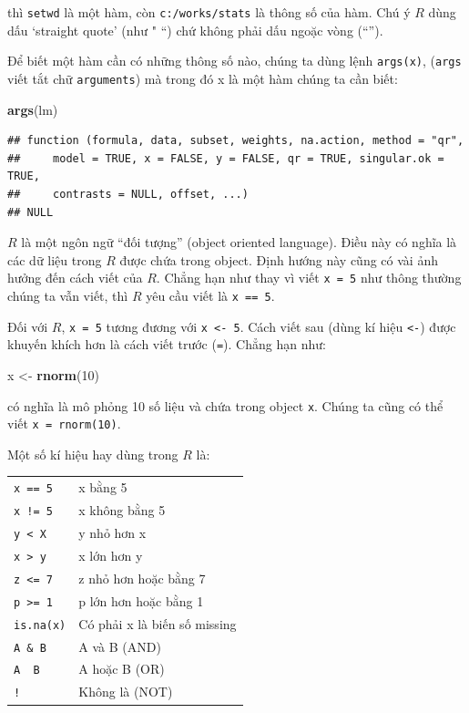 \documentclass[
]{book}
\newenvironment{Shaded}{\begin{snugshade}}{\end{snugshade}}
\newcommand{\DecValTok}[1]{\textcolor[rgb]{0.00,0.00,0.81}{#1}}
\newcommand{\KeywordTok}[1]{\textcolor[rgb]{0.13,0.29,0.53}{\textbf{#1}}}
\newcommand{\NormalTok}[1]{#1}
\newcommand{\StringTok}[1]{\textcolor[rgb]{0.31,0.60,0.02}{#1}}
\begin{document}
thì \texttt{setwd} là một hàm, còn \texttt{c:/works/stats} là thông số của hàm. Chú ý \(R\) dùng dấu `straight quote' (như " ``) chứ không phải dấu ngoặc vòng (``'').

Để biết một hàm cần có những thông số nào, chúng ta dùng lệnh \texttt{args(x)}, (\texttt{args} viết tắt chữ \texttt{arguments}) mà trong đó x là một hàm chúng ta cần biết:

\begin{Shaded}
\begin{Highlighting}[]
\KeywordTok{args}\NormalTok{(lm)}
\end{Highlighting}
\end{Shaded}

\begin{verbatim}
## function (formula, data, subset, weights, na.action, method = "qr", 
##     model = TRUE, x = FALSE, y = FALSE, qr = TRUE, singular.ok = TRUE, 
##     contrasts = NULL, offset, ...) 
## NULL
\end{verbatim}

\(R\) là một ngôn ngữ ``đối tượng'' (object oriented language). Điều này có nghĩa là các dữ liệu trong \(R\) được chứa trong object. Định hướng này cũng có vài ảnh hưởng đến cách viết của \(R\). Chẳng hạn như thay vì viết \texttt{x\ =\ 5} như thông thường chúng ta vẫn viết, thì \(R\) yêu cầu viết là \texttt{x\ ==\ 5}.

Đối với \(R\), \texttt{x\ =\ 5} tương đương với \texttt{x\ \textless{}-\ 5}. Cách viết sau (dùng kí hiệu \texttt{\textless{}-}) được khuyến khích hơn là cách viết trước (\texttt{=}). Chẳng hạn như:

\begin{Shaded}
\begin{Highlighting}[]
\NormalTok{x \textless{}{-}}\StringTok{ }\KeywordTok{rnorm}\NormalTok{(}\DecValTok{10}\NormalTok{) }
\end{Highlighting}
\end{Shaded}

có nghĩa là mô phỏng 10 số liệu và chứa trong object \texttt{x}. Chúng ta cũng có thể viết \texttt{x\ =\ rnorm(10)}.

Một số kí hiệu hay dùng trong \(R\) là:

\begin{longtable}[]{@{}ll@{}}
\toprule
\endhead
\texttt{x\ ==\ 5} & x bằng 5\tabularnewline
\texttt{x\ !=\ 5} & x không bằng 5\tabularnewline
\texttt{y\ \textless{}\ X} & y nhỏ hơn x\tabularnewline
\texttt{x\ \textgreater{}\ y} & x lớn hơn y\tabularnewline
\texttt{z\ \textless{}=\ 7} & z nhỏ hơn hoặc bằng 7\tabularnewline
\texttt{p\ \textgreater{}=\ 1} & p lớn hơn hoặc bằng 1\tabularnewline
\texttt{is.na(x)} & Có phải x là biến số missing\tabularnewline
\texttt{A\ \&\ B} & A và B (AND)\tabularnewline
\texttt{A\ \textbar{}\ B} & A hoặc B (OR)\tabularnewline
\texttt{!} & Không là (NOT)\tabularnewline
\bottomrule
\end{longtable}
\end{document}
